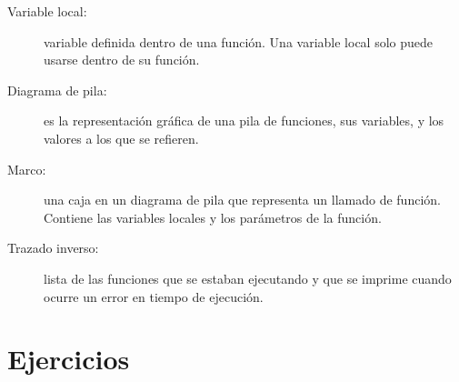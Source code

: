 \begin{description}
	\item[Variable local:]  variable definida dentro de una función.  Una
	variable local solo puede usarse dentro de su función.
	
	\item[Diagrama de pila:]  es la representación gráfica de una pila de  
	funciones,
	sus variables, y los valores a los que se refieren.
	
	\item[Marco:]  una caja en un diagrama de pila que representa un llamado de 
	función.
	Contiene las variables locales y los parámetros de la función.
	
	\item[Trazado inverso:]  lista de las funciones que se estaban ejecutando y 
	que se
	imprime cuando ocurre un error en tiempo de ejecución.
	
\end{description}

\section{Ejercicios}

